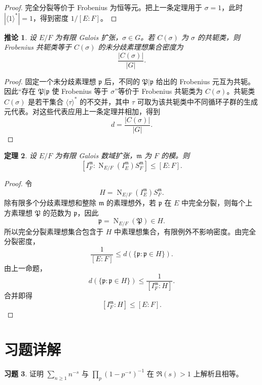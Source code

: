 \documentclass[11pt,a4paper,openany]{ctexbook}
\numberwithin{equation}{chapter}
\newcommand{\Nm}{\operatorname{N}}
\theoremstyle{plain}
\newtheorem{theorem}{定理}[chapter]
\newtheorem{corollary}[theorem]{推论}
\theoremstyle{definition}
\newtheorem{exercise}[theorem]{习题}
\theoremstyle{remark}
\begin{document}
\begin{proof}
完全分裂等价于 Frobenius 为恒等元。把上一条定理用于 $\sigma=1$，此时
\(|\langle1\rangle^\ast|=1\)，得到密度 $1/[E:F]$。
\end{proof}

\begin{corollary}
设 $E/F$ 为有限 Galois 扩张，$\sigma\in G$。若 $C(\sigma)$ 为 $\sigma$ 的共轭类，则 Frobenius 共轭类等于 $C(\sigma)$ 的未分歧素理想集合密度为
\[
\frac{|C(\sigma)|}{|G|}.
\]
\end{corollary}

\begin{proof}
固定一个未分歧素理想 $\mathfrak p$ 后，不同的 $\mathfrak P|\mathfrak p$ 给出的 Frobenius 元互为共轭。因此“存在 $\mathfrak P|\mathfrak p$ 使 Frobenius 等于
$\sigma$”等价于 Frobenius 共轭类为 $C(\sigma)$。共轭类 $C(\sigma)$ 是若干集合
\(\langle\tau\rangle^\ast\) 的不交并，其中 $\tau$ 可取为该共轭类中不同循环子群的生成元代表。对这些代表应用上一条定理并相加，得到
\[
d=\frac{|C(\sigma)|}{|G|}.
\]
\end{proof}

\begin{theorem}
设 $E/F$ 为有限 Galois 数域扩张，$\mathfrak m$ 为 $F$ 的模。则
\[
[I_F^{\mathfrak m}:\Nm_{E/F}(I_E^{\mathfrak m})S_F^{\mathfrak m}]
\le [E:F].
\]
\end{theorem}

\begin{proof}
令
\[
H=\Nm_{E/F}(I_E^{\mathfrak m})S_F^{\mathfrak m}.
\]
除有限多个分歧素理想和整除 $\mathfrak m$ 的素理想外，若 $\mathfrak p$ 在 $E$ 中完全分裂，则每个上方素理想 $\mathfrak P$ 的范数为 $\mathfrak p$，因此
\[
\mathfrak p=\Nm_{E/F}(\mathfrak P)\in H.
\]
所以完全分裂素理想集合包含于 $H$ 中素理想集合，有限例外不影响密度。由完全分裂密度，
\[
\frac1{[E:F]}\le d(\{\mathfrak p:\mathfrak p\in H\}).
\]
由上一命题，
\[
d(\{\mathfrak p:\mathfrak p\in H\})
\le \frac1{[I_F^{\mathfrak m}:H]}.
\]
合并即得
\[
[I_F^{\mathfrak m}:H]\le [E:F].
\]
\end{proof}

\section*{习题详解}

\begin{exercise}
证明 $\sum_{n\ge1}n^{-s}$ 与 $\prod_p(1-p^{-s})^{-1}$ 在 $\Re(s)>1$ 上解析且相等。
\end{exercise}
\end{document}
